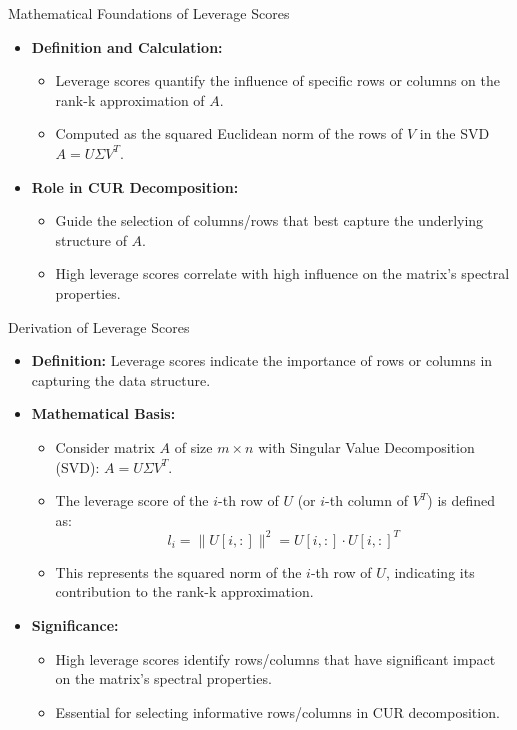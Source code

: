 \documentclass[pdf]{beamer}
\begin{document}
\begin{frame}{Mathematical Foundations of Leverage Scores}
    \begin{itemize}
        \item \textbf{Definition and Calculation:}
            \begin{itemize}
                \item Leverage scores quantify the influence of specific rows or columns on the rank-k approximation of \( A \).
                \item Computed as the squared Euclidean norm of the rows of \( V \) in the SVD \( A = U \Sigma V^T \).
            \end{itemize}
        \item \textbf{Role in CUR Decomposition:}
            \begin{itemize}
                \item Guide the selection of columns/rows that best capture the underlying structure of \( A \).
                \item High leverage scores correlate with high influence on the matrix's spectral properties.
            \end{itemize}
    \end{itemize}
\end{frame}

\begin{frame}{Derivation of Leverage Scores}
    \begin{itemize}
        \item \textbf{Definition:} Leverage scores indicate the importance of rows or columns in capturing the data structure.
        \item \textbf{Mathematical Basis:}
            \begin{itemize}
                \item Consider matrix \( A \) of size \( m \times n \) with Singular Value Decomposition (SVD): \( A = U \Sigma V^T \).
                \item The leverage score of the \( i \)-th row of \( U \) (or \( i \)-th column of \( V^T \)) is defined as:
                \[
                l_i = \| U[i,:] \|^2 = U[i,:] \cdot U[i,:]^T
                \]
                \item This represents the squared norm of the \( i \)-th row of \( U \), indicating its contribution to the rank-k approximation.
            \end{itemize}
        \item \textbf{Significance:}
            \begin{itemize}
                \item High leverage scores identify rows/columns that have significant impact on the matrix's spectral properties.
                \item Essential for selecting informative rows/columns in CUR decomposition.
            \end{itemize}
    \end{itemize}
\end{frame}
\end{document}
